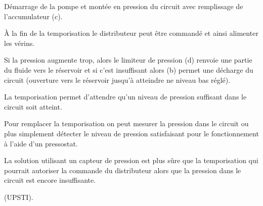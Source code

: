 \ifprof
\begin{corrige}
Démarrage de la pompe et montée en pression du circuit avec remplissage de l’accumulateur (c).

À la fin de la temporisation le distributeur peut être commandé et ainsi alimenter les vérins.

Si la pression augmente trop, alors le limiteur de pression (d) renvoie une partie du fluide vers le
réservoir et si c’est insuffisant alors (b) permet une décharge du circuit (ouverture vers le réservoir
jusqu’à atteindre ne niveau bas réglé).

La temporisation permet d’attendre qu’un niveau de pression suffisant dans le circuit soit atteint.

Pour remplacer la temporisation on peut mesurer la pression dans le circuit ou plus simplement détecter
le niveau de pression satisfaisant pour le fonctionnement à l’aide d’un pressostat.

La solution utilisant un capteur de pression est plus sûre que la temporisation qui pourrait autoriser la
commande du distributeur alors que la pression dans le circuit est encore insuffisante.

(UPSTI). 
\end{corrige}
\else
\fi


\ifprof
\else
{}
\fi